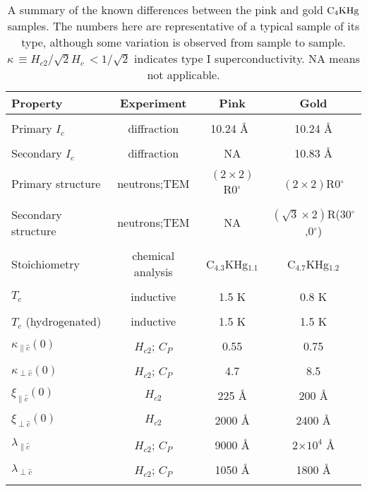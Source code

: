 \pagestyle{empty}

\begin{table}
\begin{center}
\caption[]{A summary of the known differences between the  pink and gold $\rm
C_4KHg$ samples.  The  numbers here are  representative of a typical sample
of its type, although  some variation is  observed from  sample  to sample.
$\kappa
\, \equiv H_{c2} / \sqrt{2} H_c \,  < 1/\sqrt{2}$ indicates  type I   superconductivity.\nocite{tinkham80} NA
means not applicable.}
\label{pink-gold}
\begin{tabular}{||l|c|c|c||}
\hline
Property & Experiment & Pink  & Gold \\ 
\hline
& & & \\
Primary $I_c$ & diffraction\nocite{kamitakahara84,lagrange83}& 10.24 \AA\ &
10.24 \AA \\
& & & \\
Secondary $I_c$ & diffraction\nocite{kamitakahara84,lagrange83}& NA  &10.83 \AA \\
& & & \\
Primary structure & neutrons\nocite{kamitakahara84};TEM\nocite{J140} & $(2 \times 2)$R0$^{\circ}$ &  $(2 \times 2)$R0$^{\circ}$  \\
& & & \\
Secondary structure & neutrons\nocite{kamitakahara84};TEM\nocite{J140} &NA & $(\sqrt{3} \times 2)$R(30$^{\circ}$,0$^{\circ}$) \\
& & & \\
Stoichiometry & chemical analysis & C$_{4.3}$KHg$_{1.1}$ & C$_{4.7}$KHg$_{1.2}$ \\
& & & \\
$T_c$ & inductive & 1.5 K & 0.8 K \\
& & & \\
$T_c$ (hydrogenated) & inductive  & 1.5 K\nocite{H242} & 1.5 K\nocite{H242} \\
& & & \\
$ \kappa_{\parallel\hat{c}}(0)$ & $H_{c2}$; $C_P$  & 0.55 & 0.75 \\
& & & \\
$ \kappa_{\perp\hat{c}}(0)$& $H_{c2}$; $C_P$  & 4.7 & 8.5 \\
& & & \\
$\xi_{\parallel \hat{c}}(0)$ & $H_{c2}$ & 225 \AA & 200 \AA \\
& & & \\
$\xi_{\perp \hat{c}}(0)$ & $H_{c2}$ & 2000 \AA & 2400 \AA \\
& & & \\
$\lambda_{\parallel \hat{c}}$ & $H_{c2}$; $ C_P$ & 9000 \AA & 2$\times 10^4$ \AA\\
& & & \\
$\lambda_{\perp \hat{c}}$ & $H_{c2}$; $ C_P$ & 1050 \AA & 1800 \AA \\
& & & \\
\hline
\end{tabular}
\end{center}
\end{table}

